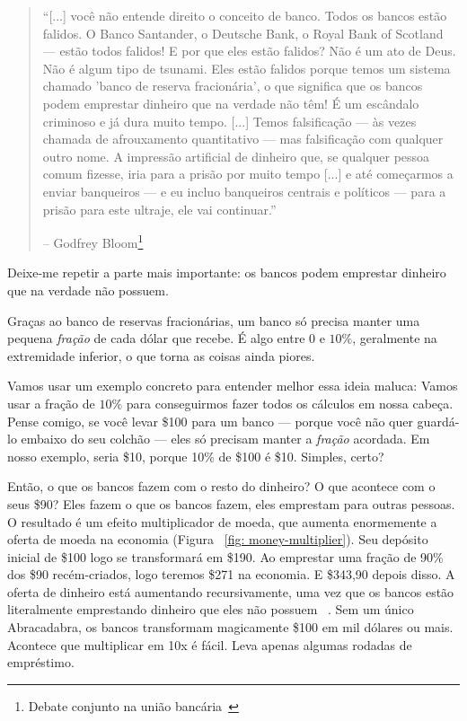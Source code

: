 \begin{quotation}\begin{samepage}
\enquote{[...] você não entende direito o conceito de banco. Todos os bancos estão falidos. O Banco Santander, o Deutsche Bank, o Royal Bank of Scotland --- estão todos falidos! E por que eles estão falidos? Não é um ato de Deus. Não é algum tipo de tsunami. Eles estão falidos porque temos um sistema chamado 'banco de reserva fracionária', o que significa que os bancos podem emprestar dinheiro que na verdade não têm! É um escândalo criminoso e já dura muito tempo. [...] Temos falsificação --- às vezes chamada de afrouxamento quantitativo --- mas falsificação com qualquer outro nome. A impressão artificial de dinheiro que, se qualquer pessoa comum fizesse, iria para a prisão por muito tempo [...] e até começarmos a enviar banqueiros --- e eu incluo banqueiros centrais e políticos --- para a prisão para este ultraje, ele vai continuar.}
\begin{flushright} -- Godfrey Bloom\footnote{Debate conjunto na união bancária~\cite{godfrey-bloom}}
\end{flushright}\end{samepage}\end{quotation}

Deixe-me repetir a parte mais importante: os bancos podem emprestar dinheiro que na verdade não possuem.

Graças ao banco de reservas fracionárias, um banco só precisa manter uma pequena \textit{fração} de cada dólar que recebe. É algo entre $0$ e $10\%$, geralmente na extremidade inferior, o que torna as coisas ainda piores.

Vamos usar um exemplo concreto para entender melhor essa ideia maluca: Vamos usar a fração de $10\%$ para conseguirmos fazer todos os cálculos em nossa cabeça. Pense comigo, se você levar \$100 para um banco --- porque você não quer guardá-lo embaixo do seu colchão --- eles só precisam manter a \textit{fração} acordada. Em nosso exemplo, seria \$10, porque 10\% de \$100 é \$10. Simples, certo?

Então, o que os bancos fazem com o resto do dinheiro? O que acontece com o seus \$90? Eles fazem o que os bancos fazem, eles emprestam para outras pessoas. O resultado é um efeito multiplicador de moeda, que aumenta enormemente a oferta de moeda na economia (Figura ~\ref{fig: money-multiplier}). Seu depósito inicial de \$100 logo se transformará em \$190. Ao emprestar uma fração de 90\% dos \$90 recém-criados, logo teremos \$271 na economia. E \$343,90 depois disso. A oferta de dinheiro está aumentando recursivamente, uma vez que os bancos estão literalmente emprestando dinheiro que eles não possuem ~\cite{wiki:money-multiplier}. Sem um único Abracadabra, os bancos transformam magicamente \$100 em mil dólares ou mais. Acontece que multiplicar em 10x é fácil. Leva apenas algumas rodadas de empréstimo.


